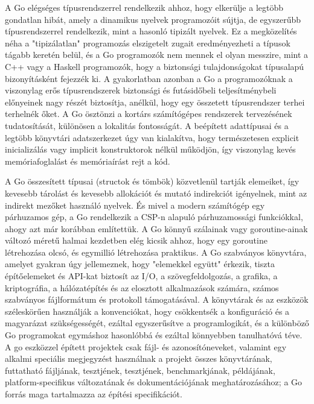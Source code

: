 A Go elégséges típusrendszerrel rendelkezik ahhoz, hogy elkerülje a legtöbb gondatlan hibát, amely a dinamikus nyelvek programozóit sújtja, de egyszerűbb típusrendszerrel rendelkezik, mint a hasonló tipizált nyelvek. Ez a megközelítés néha a "tipizálatlan" programozás elszigetelt zugait eredményezheti a típusok tágabb keretén belül, és a Go programozók nem mennek el olyan messzire, mint a C++ vagy a Haskell programozók, hogy a biztonsági tulajdonságokat típusalapú bizonyításként fejezzék ki. A gyakorlatban azonban a Go a programozóknak a viszonylag erős típusrendszerek biztonsági és futásidőbeli teljesítménybeli előnyeinek nagy részét biztosítja, anélkül, hogy egy összetett típusrendszer terhei terhelnék őket. A Go ösztönzi a kortárs számítógépes rendszerek tervezésének tudatosítását, különösen a lokalitás fontosságát. A beépített adattípusai és a legtöbb könyvtári adatszerkezet úgy van kialakítva, hogy természetesen explicit inicializálás vagy implicit konstruktorok nélkül működjön, így viszonylag kevés memóriafoglalást és memóriaírást rejt a kód.

A Go összesített típusai (structok és tömbök) közvetlenül tartják elemeiket, így kevesebb tárolást és kevesebb allokációt és mutató indirekciót igényelnek, mint az indirekt mezőket használó nyelvek. És mivel a modern számítógép egy párhuzamos gép, a Go rendelkezik a CSP-n alapuló párhuzamossági funkciókkal, ahogy azt már korábban említettük. A Go könnyű szálainak vagy goroutine-ainak változó méretű halmai kezdetben elég kicsik ahhoz, hogy egy goroutine létrehozása olcsó, és egymillió létrehozása praktikus. A Go szabványos könyvtára, amelyet gyakran úgy jellemeznek, hogy "elemekkel együtt" érkezik, tiszta építőelemeket és API-kat biztosít az I/O, a szövegfeldolgozás, a grafika, a kriptográfia, a hálózatépítés és az elosztott alkalmazások számára, számos szabványos fájlformátum és protokoll támogatásával. A könyvtárak és az eszközök széleskörűen használják a konvenciókat, hogy csökkentsék a konfiguráció és a magyarázat szükségességét, ezáltal egyszerűsítve a programlogikát, és a különböző Go programokat egymáshoz hasonlóbbá és ezáltal könnyebben tanulhatóvá téve. A go eszközzel épített projektek csak fájl- és azonosítóneveket, valamint egy alkalmi speciális megjegyzést használnak a projekt összes könyvtárának, futtatható fájljának, tesztjének, tesztjének, benchmarkjának, példájának, platform-specifikus változatának és dokumentációjának meghatározásához; a Go forrás maga tartalmazza az építési specifikációt.
\cite{Alan15}

